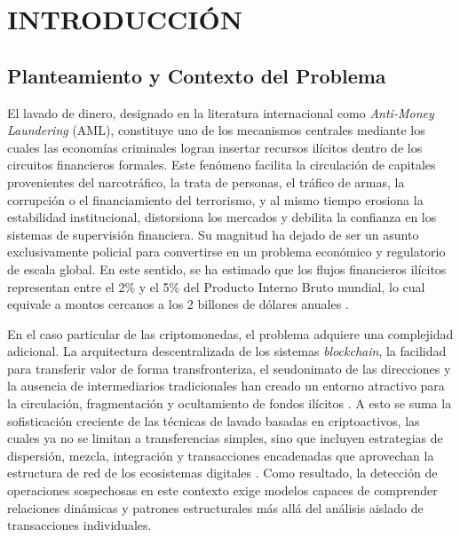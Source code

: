 \chapter{INTRODUCCIÓN}

\section{Planteamiento y Contexto del Problema}

El lavado de dinero, designado en la literatura internacional como \textit{Anti-Money Laundering} (AML), constituye uno de los mecanismos centrales mediante los cuales las economías criminales logran insertar recursos ilícitos dentro de los circuitos financieros formales. Este fenómeno facilita la circulación de capitales provenientes del narcotráfico, la trata de personas, el tráfico de armas, la corrupción o el financiamiento del terrorismo, y al mismo tiempo erosiona la estabilidad institucional, distorsiona los mercados y debilita la confianza en los sistemas de supervisión financiera. Su magnitud ha dejado de ser un asunto exclusivamente policial para convertirse en un problema económico y regulatorio de escala global. En este sentido, se ha estimado que los flujos financieros ilícitos representan entre el 2\% y el 5\% del Producto Interno Bruto mundial, lo cual equivale a montos cercanos a los 2 billones de dólares anuales \cite{UNODC2024EstimatingCrimes}.

\bigskip

En el caso particular de las criptomonedas, el problema adquiere una complejidad adicional. La arquitectura descentralizada de los sistemas \textit{blockchain}, la facilidad para transferir valor de forma transfronteriza, el seudonimato de las direcciones y la ausencia de intermediarios tradicionales han creado un entorno atractivo para la circulación, fragmentación y ocultamiento de fondos ilícitos \cite{Spotlight2021Cryptocurrencies:Finances, Subashi2024CryptocurrenciesLaundering}. A esto se suma la sofisticación creciente de las técnicas de lavado basadas en criptoactivos, las cuales ya no se limitan a transferencias simples, sino que incluyen estrategias de dispersión, mezcla, integración y transacciones encadenadas que aprovechan la estructura de red de los ecosistemas digitales \cite{Almeida2025FromTechniques}. Como resultado, la detección de operaciones sospechosas en este contexto exige modelos capaces de comprender relaciones dinámicas y patrones estructurales más allá del análisis aislado de transacciones individuales.

